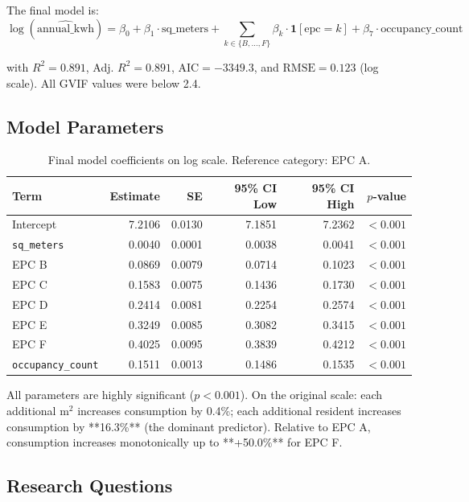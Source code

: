 \documentclass[11pt, a4paper]{article}
\begin{document}
The final model is:
$$\log(\widehat{\text{annual\_kwh}}) = \beta_0 + \beta_1 \cdot \text{sq\_meters} + \sum_{k \in \{B,\ldots,F\}} \beta_k \cdot \mathbf{1}[\text{epc}=k] + \beta_7 \cdot \text{occupancy\_count}$$

with $R^2 = 0.891$, Adj. $R^2 = 0.891$, $\text{AIC} = -3349.3$, and $\text{RMSE} = 0.123$ (log scale). All GVIF values were below 2.4.

\subsection{Model Parameters}\label{subsec:parameters}

\begin{table}[H]
\centering
\caption{Final model coefficients on log scale. Reference category: EPC A.}\label{tab:coefficients}
\begin{tabular}{lrrrrr}
\toprule
\textbf{Term} & \textbf{Estimate} & \textbf{SE} & \textbf{95\% CI Low} & \textbf{95\% CI High} & \textbf{$p$-value} \\
\midrule
Intercept          & 7.2106 & 0.0130 & 7.1851 & 7.2362 & $<0.001$ \\
\texttt{sq\_meters}& 0.0040 & 0.0001 & 0.0038 & 0.0041 & $<0.001$ \\
EPC B              & 0.0869 & 0.0079 & 0.0714 & 0.1023 & $<0.001$ \\
EPC C              & 0.1583 & 0.0075 & 0.1436 & 0.1730 & $<0.001$ \\
EPC D              & 0.2414 & 0.0081 & 0.2254 & 0.2574 & $<0.001$ \\
EPC E              & 0.3249 & 0.0085 & 0.3082 & 0.3415 & $<0.001$ \\
EPC F              & 0.4025 & 0.0095 & 0.3839 & 0.4212 & $<0.001$ \\
\texttt{occupancy\_count} & 0.1511 & 0.0013 & 0.1486 & 0.1535 & $<0.001$ \\
\bottomrule
\end{tabular}
\end{table}

All parameters are highly significant ($p < 0.001$). On the original scale: each additional $\text{m}^2$ increases consumption by 0.4\%; each additional resident increases consumption by **16.3\%** (the dominant predictor). Relative to EPC A, consumption increases monotonically up to **+50.0\%** for EPC F.

\subsection{Research Questions}\label{subsec:rqs}
\end{document}
